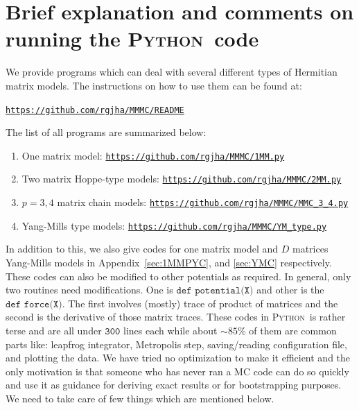 \documentclass[11pt]{article}
\newcommand{\PY}{\textsc{Python}}
\begin{document}
\section{\label{sec:BEOC}Brief explanation and comments on 
running the \PY~code}
We provide programs which can deal with several different types of Hermitian matrix models. The instructions on how to use them can be found at:  
\begin{center} \texttt{\href{https://github.com/rgjha/MMMC\#readme}{https://github.com/rgjha/MMMC/README}} \end{center}
 The list of all programs are summarized below:
\begin{enumerate}
	\item One matrix model: \texttt{\href{https://github.com/rgjha/MMMC/1MM.py}{https://github.com/rgjha/MMMC/1MM.py}}
	\item Two matrix Hoppe-type models: \texttt{\href{https://github.com/rgjha/MMMC/2MM.py}{https://github.com/rgjha/MMMC/2MM.py}}  
	\item $p=3,4$ matrix chain models: \texttt{\href{https://github.com/rgjha/MMMC/MMC_3_4.py}{https://github.com/rgjha/MMMC/MMC\_3\_4.py}}
	\item Yang-Mills type models: \texttt{\href{https://github.com/rgjha/MMMC/YM_type.py}{https://github.com/rgjha/MMMC/YM\_type.py}}
\end{enumerate}
In addition to this, we also give codes for one matrix model and $D$ matrices Yang-Mills models in Appendix~\ref{sec:1MMPYC}, and \ref{sec:YMC} respectively.
These codes can also be modified to other potentials as required. In general, only two routines need modifications. 
One is $\texttt{def potential(X)}$ and other is the $\texttt{def force(X)}$. 
The first involves (mostly) trace of product of matrices and the second is the 
derivative of those matrix traces. 
These codes in \PY~is rather terse
and are all under $\texttt{300}$ lines each
while about $\sim 85\%$ of them are common parts like:
leapfrog integrator, Metropolis step, saving/reading configuration file, 
and plotting the data. We have tried no optimization to make it efficient and the
only motivation is that someone who has never ran a MC code can do
so quickly and use it as guidance for deriving exact results or for
bootstrapping purposes. We need to take care of few things which are 
mentioned below.  
\end{document}
